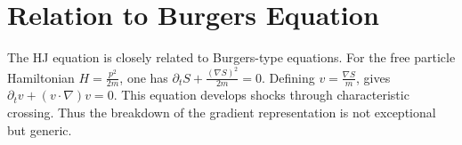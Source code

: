 \section{Relation to Burgers Equation}

The HJ equation is closely related to Burgers-type equations.
For the free particle Hamiltonian $H=\frac{p^2}{2m}$,
one has $\partial_t S + \frac{(\nabla S)^2}{2m}=0$.
Defining $v=\frac{\nabla S}{m}$, gives $\partial_t v + (v\cdot\nabla)v=0$.
This equation develops shocks through characteristic crossing. Thus the
breakdown of the gradient representation is not exceptional but generic.

